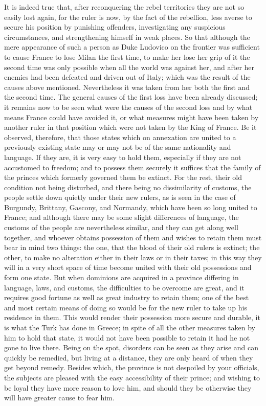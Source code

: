 \documentclass[12pt,letterpaper]{memoir}
\begin{document}
It is indeed true that, after reconquering the rebel territories they
are not so easily lost again, for the ruler is now, by the fact of the
rebellion, less averse to secure his position by punishing offenders,
investigating any suspicious circumstances, and strengthening himself
in weak places. So that although the mere appearance of such a person
as Duke Ludovico on the frontier was sufficient to cause France to lose
Milan the first time, to make her lose her grip of it the second time
was only possible when all the world was against her, and after her
enemies had been defeated and driven out of Italy; which was the result
of the causes above mentioned. Nevertheless it was taken from her both
the first and the second time. The general causes of the first loss
have been already discussed; it remains now to be seen what were the
causes of the second loss and by what means France could have avoided
it, or what measures might have been taken by another ruler in that
position which were not taken by the King of France. Be it observed,
therefore, that those states which on annexation are united to a
previously existing state may or may not be of the same nationality
and language. If they are, it is very easy to hold them, especially if
they are not accustomed to freedom; and to possess them securely it
suffices that the family of the princes which formerly governed them
be extinct. For the rest, their old condition not being disturbed, and
there being no dissimilarity of customs, the people settle down quietly
under their new rulers, as is seen in the case of Burgundy, Brittany,
Gascony, and Normandy, which have been so long united to France; and
although there may be some slight differences of language, the customs
of the people are nevertheless similar, and they can get along well
together, and whoever obtains possession of them and wishes to retain
them must bear in mind two things: the one, that the blood of their old
rulers is extinct; the other, to make no alteration either in their
laws or in their taxes; in this way they will in a very short space of
time become united with their old possessions and form one state. But
when dominions are acquired in a province differing in language, laws,
and customs, the difficulties to be overcome are great, and it requires
good fortune as well as great industry to retain them; one of the best
and most certain means of doing so would be for the new ruler to take
up his residence in them. This would render their possession more
secure and durable, it is what the Turk has done in Greece; in spite of
all the other measures taken by him to hold that state, it would not
have been possible to retain it had he not gone to live there. Being
on the spot, disorders can be seen as they arise and can quickly be
remedied, but living at a distance, they are only heard of when they
get beyond remedy. Besides which, the province is not despoiled by
your officials, the subjects are pleased with the easy accessibility
of their prince; and wishing to be loyal they have more reason to love
him, and should they be otherwise they will have greater cause to fear
him.
\end{document}
